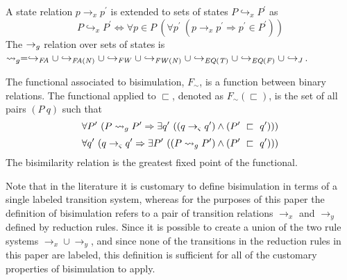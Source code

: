 \begin{definition}
\label{def:meta}
A state relation $p \rightarrow_x p^\prime$ is extended to sets of states $P \hookrightarrow_x P^\prime$ as
$$
P \hookrightarrow_x P^\prime \Longleftrightarrow \forall p \in P\ (\forall p^\prime\ (p \rightarrow_x p^\prime \Rightarrow p^\prime \in P^\prime))
$$
The $\rightarrow_{g}$ relation over sets of states is $\leadsto_{g} = \hookrightarrow_\mathit{FA} \cup \hookrightarrow_\mathit{FA(N)} \cup \hookrightarrow_\mathit{FW} \cup \hookrightarrow_\mathit{FW(N)} \cup \hookrightarrow_\mathit{EQ(T)} \cup \hookrightarrow_\mathit{EQ(F)} \cup \hookrightarrow_{J}$.%
\end{definition}


\begin{definition}
\label{bisimulation}
The functional associated to bisimulation,  $F_\sim$, is a function between binary relations. The functional applied to $\sqsubset$, denoted as $F_\sim(\sqsubset)$, is the set of all pairs
$(P\ q)$ such that
\begin{equation}
\label{eqn:BisimulationForwards}
\forall P^\prime\ ( P \leadsto_{g} P^\prime \Rightarrow \exists q^\prime\ ( (q \rightarrow_{\varsigma} q^\prime )\wedge (P^\prime\ \sqsubset\ q^\prime )))
\end{equation}
\begin{equation}
\label{eqn:BisimulationBackwards}
\forall q^\prime\ ( q \rightarrow_{\varsigma} q^\prime\Rightarrow \exists P^\prime\ ( (P \leadsto_{g} P^\prime )\wedge (P^\prime\ \sqsubset\ q^\prime )))
\end{equation}
The bisimilarity relation is the greatest fixed point of the functional.
\end{definition}

Note that in the literature it is customary to define bisimulation in
terms of a single labeled transition system, whereas for the purposes
of this paper the definition of bisimulation refers to a pair of
transition relations $\rightarrow_x$ and $\rightarrow_y$ defined by
reduction rules. Since it is possible to create a union of the two
rule systems $\rightarrow_x \cup \rightarrow_y$, and since none of the
transitions in the reduction rules in this paper are labeled, this
definition is sufficient for all of the customary properties of
bisimulation to apply. 


